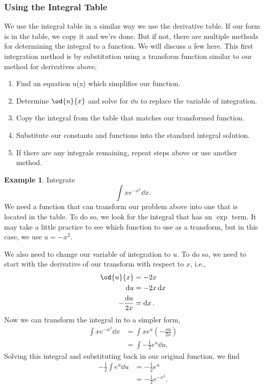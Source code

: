 \documentclass[final,a4paper,12pt]{article}
\theoremstyle{definition}
\newtheorem{example}{Example}[section]
\begin{document}
\subsubsection{Using the Integral Table}
We use the integral table in a similar way we use the derivative table.  If our
form is in the table, we copy it and we're done.  But if not, there are multiple
methods for determining the integral to a function.  We will discuss a few here.
This first integration method is by substitution using a transform function
similar to our method for derivatives above,
\begin{enumerate}
    \item Find an equation u(x) which simplifies our function.
    \item Determine $\od{u}{x}$ and solve for $\dd{u}$ to replace the variable of
    integration.
    \item Copy the integral from the table that matches our transformed
    function.
    \item Substitute our constants and functions into the standard integral solution.
    \item If there are any integrals remaining, repeat steps above or use
    another method.
\end{enumerate}

\begin{example}
    Integrate
    \begin{equation*}
        \int x e^{-x^2} \dd{x} .
    \end{equation*}
    We need a function that can transform our problem above into one that is
    located in the table.  To do so, we look for the integral that has an $\exp$
    term.  It may take a little practice to see which function to use as a
    transform, but in this case, we use $u = -x^2$.
    
    We also need to change our variable of integration to $u$.  To do so, we
    need to start with the derivative of our transform with respect to
    $x$, i.e.,
    \begin{align*}
        \od{u}{x} &= -2 x \\
        \dd{u} &= -2 x \dd{x} \\
        -\frac{\dd{u}}{2 x} &= \dd{x} .
    \end{align*}
    Now we can transform the integral in to a simpler form,
    \begin{align*}
        \int x e^{-x^2} \dd{x} &= \int x e^u \left(- \frac{\dd{u}}{2 x} \right) \\
        &= \int -\frac{1}{2} e^u \dd{u} .
    \end{align*}
    Solving this integral and substituting back in our original function, we
    find
    \begin{align*}
        -\frac{1}{2} \int e^u \dd{u} &= -\frac{1}{2} e^u \\
        &= -\frac{1}{2} e^{-x^2} .
    \end{align*}

\end{example}
\end{document}

